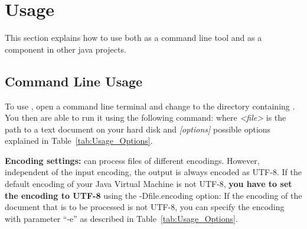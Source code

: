 \section{Usage}\label{sec:Usage}
This section explains how to use \product{} both as a command line tool and as a component in other java projects.

\subsection{Command Line Usage}\label{sec:Usage_CommandLine}
To use \product{}, open a command line terminal and change to the directory containing \executableFile{}. You then are able to run it using the following command:\newline {} where \emph{<file>} is the path to a text document on your hard disk and \emph{[options]} possible options explained in Table~\ref{tab:Usage_Options}.

\textbf{Encoding settings:}
\product{} can process files of different encodings. However, independent of the input encoding, the output is always encoded as UTF-8. If the default encoding of your Java Virtual Machine is not UTF-8, \textbf{you have to set the encoding to UTF-8} using the -Dfile.encoding option:
\newline {}\newline
If the encoding of the document that is to be processed is not UTF-8, you can specify the encoding with parameter ``-e'' as described in Table~\ref{tab:Usage_Options}.


